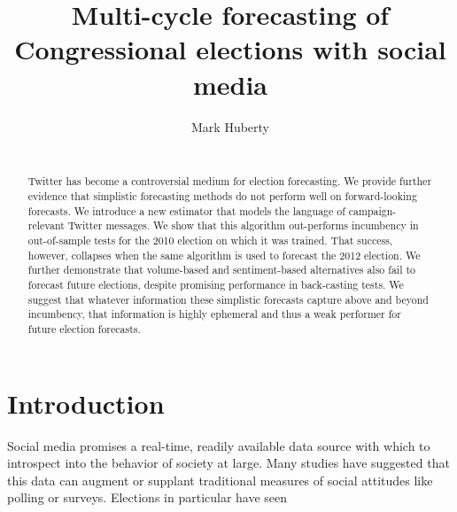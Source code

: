 \documentclass{sig-alternate-2013}
\begin{document}
\title{Multi-cycle forecasting of Congressional
  elections with social media}
\author{\alignauthor
Mark Huberty\\
\\
}

\maketitle

\begin{abstract}
  Twitter has become a controversial medium for election forecasting. We provide further evidence that simplistic forecasting methods do not perform well on forward-looking forecasts. We introduce a new estimator that models the language of campaign-relevant Twitter messages. We show that this algorithm out-performs incumbency in out-of-sample tests for the 2010 election on which it was trained. That success, however, collapses when the same algorithm is used to forecast the 2012 election. We further demonstrate that volume-based and sentiment-based alternatives also fail to forecast future elections, despite promising performance in back-casting tests. We suggest that whatever information these simplistic forecasts capture above and beyond incumbency, that information is highly ephemeral and thus a weak performer for future election forecasts.
\end{abstract}

\section{Introduction}
\label{sec:introduction}

Social media promises a real-time, readily available data source with
which to introspect into the behavior of society at large. Many
studies have suggested that this data can augment
or supplant traditional measures of social attitudes like polling or
surveys. Elections in particular have seen 
\end{document}
